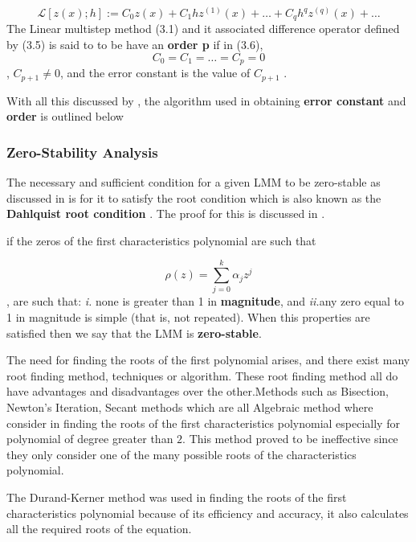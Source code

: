 \begin{equation}
   \mathcal{L}[z(x);h] := C_0z(x)+ C_1hz^{(1)}(x)+ \dots + C_qh^qz^{(q)}(x)+ \dots
\end{equation}
The Linear multistep method (3.1) and it associated difference operator defined by (3.5) is said to to be have an \textbf{order p} if in (3.6), \[C_0 = C_1 = \dots = C_p = 0 \], $C_{p+1} \neq 0$, and the error constant is the value of $C_{p+1}$ \cite{lambert1977}.

With all this discussed by \cite{lambert1977}, the algorithm used in obtaining \textbf{error constant} and \textbf{order} is outlined below



\subsubsection{Zero-Stability Analysis}
The necessary and sufficient condition for a given LMM to be zero-stable as discussed in \cite{2022JFatokunEtAl} is for it to satisfy the root condition which is also known as the \textbf{Dahlquist root condition} \cite{lambert1977}. The proof for this is discussed in \cite{keller2020discovery}.

if the zeros of the first characteristics polynomial are such that

\[\rho(z) = \sum_{j=0}^{k}\alpha_jz^{j}\], are such that: \textit{i.} none is greater than 1 in \textbf{magnitude}, and \textit{ii.}any zero equal to 1 in magnitude is simple (that is, not repeated). When this properties are satisfied then we say that the LMM is \textbf{zero-stable}.

The need for finding the roots of the first polynomial arises, and there exist many root finding method, techniques or algorithm. These root finding method all do have advantages and disadvantages over the other.Methods such as Bisection, Newton's Iteration, Secant methods which are all Algebraic method where consider in finding the roots of the first characteristics polynomial especially for polynomial of degree greater than $2$. This method proved to be ineffective since they only consider one of the many possible roots of the characteristics polynomial.

The Durand-Kerner method was used in finding the roots of the first characteristics polynomial because of its efficiency and accuracy, it also calculates all the required roots of the equation.
